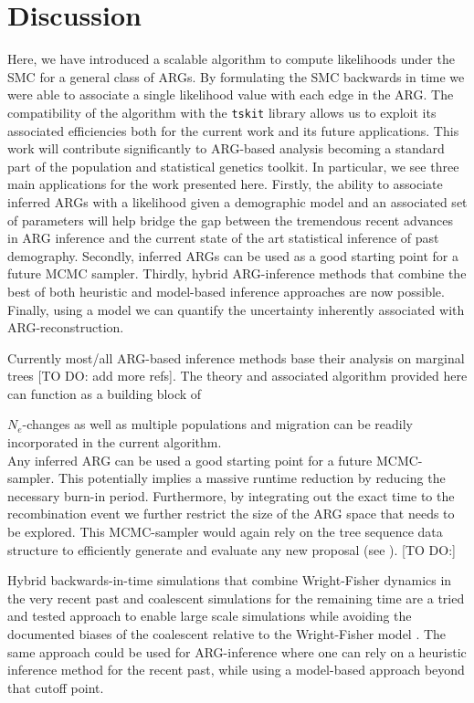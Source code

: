 \documentclass{article}
\begin{document}
\section{Discussion}

Here, we have introduced a scalable algorithm to compute likelihoods 
under the SMC for a general class of ARGs. By formulating the SMC backwards in time 
we were able to associate a single likelihood value with each edge in the ARG. 
The compatibility of the algorithm with the \texttt{tskit} library allows us to 
exploit its associated efficiencies both for the current work and its future 
applications. This work will contribute significantly 
to ARG-based analysis becoming a standard part of the population 
and statistical genetics toolkit. 
In particular, we see three main applications for the work presented here. 
Firstly, the ability to associate inferred ARGs with a likelihood given a demographic 
model and an associated set of parameters will help bridge the gap between the tremendous recent 
advances in ARG inference and the current state of the art statistical inference of 
past demography. 
Secondly, inferred ARGs can be used as a good starting point for a future MCMC sampler.
Thirdly, hybrid ARG-inference methods that combine the best of both 
heuristic and model-based inference approaches are now possible.
Finally, using a model we can quantify the uncertainty inherently associated 
with ARG-reconstruction.

Currently most/all ARG-based inference methods base their analysis on marginal 
trees \citep{hejase_2022} [TO DO: add more refs]. The theory and associated algorithm 
provided here can function as a building block of 
 
$N_e$-changes as well as multiple populations and migration can be readily incorporated 
in the current algorithm.\\

Any inferred ARG can be used a good starting point 
for a future MCMC-sampler. This potentially implies a massive runtime reduction by 
reducing the necessary burn-in period. Furthermore, by integrating out the exact time 
to the recombination event we further restrict the size of the ARG space that needs to 
be explored. This MCMC-sampler would again rely on the tree sequence data structure to 
efficiently generate and evaluate any new proposal (see \citep{mahmoudi_bayesian_2022}).
[TO DO:] 

Hybrid backwards-in-time simulations that combine Wright-Fisher dynamics in the 
very recent past and coalescent simulations for the remaining time are a tried and tested 
approach \citep{bhaskar_distortion_2014, nelson_accounting_2020} to enable large scale 
simulations while avoiding the documented biases of the coalescent relative to the 
Wright-Fisher model \citep{bhaskar_distortion_2014, wakeley_gene_2012}. The same approach 
could be used for ARG-inference where one can rely on a heuristic inference method for 
the recent past, while using a model-based approach beyond that cutoff point.\\
\end{document}
